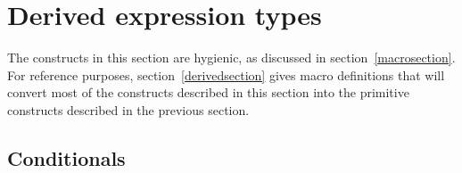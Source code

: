 \section{Derived expression types}
\label{derivedexps}

The constructs in this section are hygienic, as discussed in
section~\ref{macrosection}.
For reference purposes, section~\ref{derivedsection} gives macro definitions
that will convert most of the constructs described in this section 
into the primitive constructs described in the previous section.


\subsection{Conditionals}\unsection

